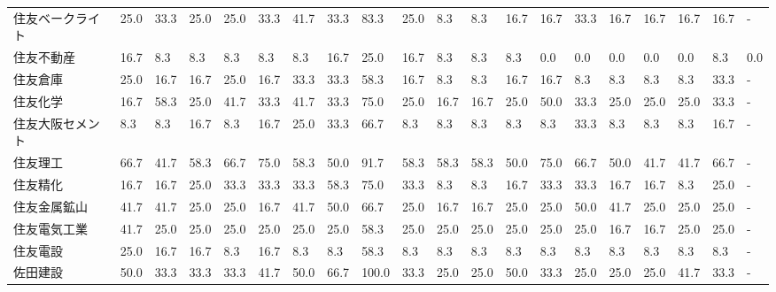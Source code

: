 \begin{tabular}{llllllllllllllllllll}
住友ベークライト        &   25.0 &   33.3 &      25.0 &      25.0 &       33.3 &   41.7 &   33.3 &   83.3 &    25.0 &     8.3 &    8.3 &  16.7 &   16.7 &    33.3 &    16.7 &  16.7 &  16.7 &  16.7 &     - \\
住友不動産           &   16.7 &    8.3 &       8.3 &       8.3 &        8.3 &    8.3 &   16.7 &   25.0 &    16.7 &     8.3 &    8.3 &   8.3 &    0.0 &     0.0 &     0.0 &   0.0 &   0.0 &   8.3 &   0.0 \\
住友倉庫            &   25.0 &   16.7 &      16.7 &      25.0 &       16.7 &   33.3 &   33.3 &   58.3 &    16.7 &     8.3 &    8.3 &  16.7 &   16.7 &     8.3 &     8.3 &   8.3 &   8.3 &  33.3 &     - \\
住友化学            &   16.7 &   58.3 &      25.0 &      41.7 &       33.3 &   41.7 &   33.3 &   75.0 &    25.0 &    16.7 &   16.7 &  25.0 &   50.0 &    33.3 &    25.0 &  25.0 &  25.0 &  33.3 &     - \\
住友大阪セメント        &    8.3 &    8.3 &      16.7 &       8.3 &       16.7 &   25.0 &   33.3 &   66.7 &     8.3 &     8.3 &    8.3 &   8.3 &    8.3 &    33.3 &     8.3 &   8.3 &   8.3 &  16.7 &     - \\
住友理工            &   66.7 &   41.7 &      58.3 &      66.7 &       75.0 &   58.3 &   50.0 &   91.7 &    58.3 &    58.3 &   58.3 &  50.0 &   75.0 &    66.7 &    50.0 &  41.7 &  41.7 &  66.7 &     - \\
住友精化            &   16.7 &   16.7 &      25.0 &      33.3 &       33.3 &   33.3 &   58.3 &   75.0 &    33.3 &     8.3 &    8.3 &  16.7 &   33.3 &    33.3 &    16.7 &  16.7 &   8.3 &  25.0 &     - \\
住友金属鉱山          &   41.7 &   41.7 &      25.0 &      25.0 &       16.7 &   41.7 &   50.0 &   66.7 &    25.0 &    16.7 &   16.7 &  25.0 &   25.0 &    50.0 &    41.7 &  25.0 &  25.0 &  25.0 &     - \\
住友電気工業          &   41.7 &   25.0 &      25.0 &      25.0 &       25.0 &   25.0 &   25.0 &   58.3 &    25.0 &    25.0 &   25.0 &  25.0 &   25.0 &    25.0 &    16.7 &  16.7 &  25.0 &  25.0 &     - \\
住友電設            &   25.0 &   16.7 &      16.7 &       8.3 &       16.7 &    8.3 &    8.3 &   58.3 &     8.3 &     8.3 &    8.3 &   8.3 &    8.3 &     8.3 &     8.3 &   8.3 &   8.3 &   8.3 &     - \\
佐田建設            &   50.0 &   33.3 &      33.3 &      33.3 &       41.7 &   50.0 &   66.7 &  100.0 &    33.3 &    25.0 &   25.0 &  50.0 &   33.3 &    25.0 &    25.0 &  25.0 &  41.7 &  33.3 &     - \\

\end{tabular}
